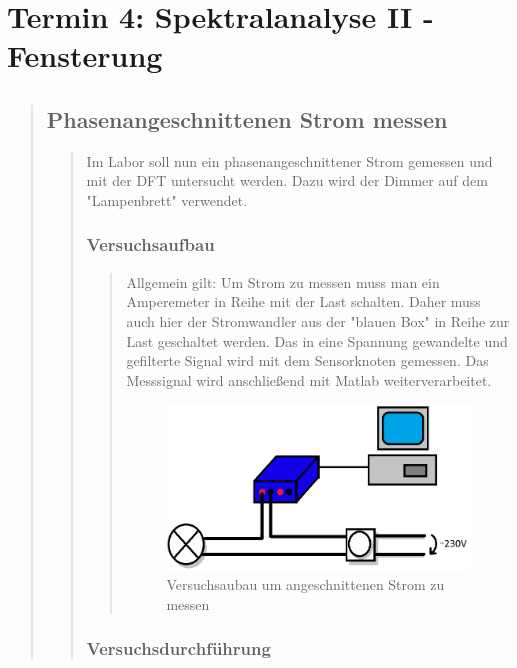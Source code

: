 \section{Termin 4: Spektralanalyse II - Fensterung}
\begin{quote}

	\subsection{Phasenangeschnittenen Strom messen}
	\begin{quote}
	Im Labor soll nun ein phasenangeschnittener Strom gemessen und mit der DFT untersucht werden.
	Dazu wird der Dimmer auf dem "Lampenbrett" verwendet.
	
		\subsubsection{Versuchsaufbau}
		\begin{quote}
		Allgemein gilt: Um Strom zu messen muss man ein Amperemeter in Reihe mit der Last schalten. 
		Daher muss auch hier der Stromwandler aus der "blauen Box" in Reihe zur Last geschaltet 
		werden. Das in eine Spannung gewandelte und gefilterte Signal wird mit dem Sensorknoten gemessen. 
		Das Messsignal wird anschließend mit Matlab weiterverarbeitet.
	
		\begin{figure}[htb]
		\centering
		\includegraphics[width=1\textwidth]{./Bilder/Versuchsaufbau1}
		\caption{Versuchsaubau um angeschnittenen Strom zu messen}
		\end{figure}
		
		\end{quote}
			
		\subsubsection{Versuchsdurchführung}
		\begin{quote}
			

\end{quote}
\end{quote}
\end{quote}
